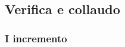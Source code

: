 \documentclass[../piano-di-progetto.tex]{subfiles}
\begin{document}
\subsection{Verifica e collaudo}


\subsubsection{I incremento}
\end{document}
